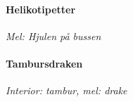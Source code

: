 \documentclass[12pt]{article}
\begin{document}
\newpage
\noindent
\begin{minipage}{.5\textwidth}
	\paragraph*{Helikotipetter\\}
	\vspace{3px}
	\textit{Mel: Hjulen på bussen}\\
\end{minipage}%
\hspace{0.05\textwidth}
\noindent
\begin{minipage}{0.45\textwidth}
	\paragraph*{Tambursdraken\\}
	\vspace{3px}
	\textit{Interior: tambur, mel: drake}\\
\end{minipage}
\end{document}

